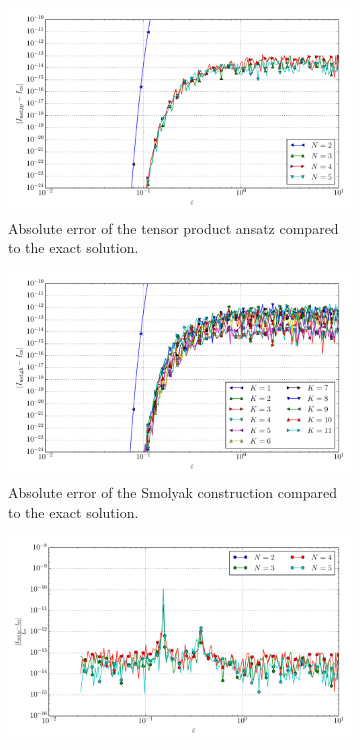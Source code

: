 \documentclass[a4paper,10pt]{article}
\begin{document}
\begin{figure}[ht!]
\begin{subfigure}[t]{0.5\linewidth}
    \includegraphics[width=\linewidth]{./plots/tp_sg_8d_conv_eps_(2,0,0,0,0,0,0,0)_(2,0,0,0,0,0,0,0)_err_nsd_tp.pdf}
    \caption{Absolute error of the tensor product ansatz compared to the exact solution.}
    \label{fig:tp_sg_8d_conv_eps_20000000_20000000_err_nsd_tp}
  \end{subfigure}
  \begin{subfigure}[t]{0.5\linewidth}
    \includegraphics[width=\linewidth]{./plots/tp_sg_8d_conv_eps_(2,0,0,0,0,0,0,0)_(2,0,0,0,0,0,0,0)_err_nsd_gk.pdf}
    \caption{Absolute error of the Smolyak construction compared to the exact solution.}
    \label{fig:tp_sg_8d_conv_eps_20000000_20000000_err_nsd_gk}
  \end{subfigure}
  \begin{subfigure}[t]{0.5\linewidth}
    \includegraphics[width=\linewidth]{./plots/tp_sg_8d_conv_eps_(2,0,0,0,0,0,0,0)_(2,0,0,0,0,0,0,0)_err_rel_nsd_tp.pdf}

\end{subfigure}
\end{figure}
\end{document}

